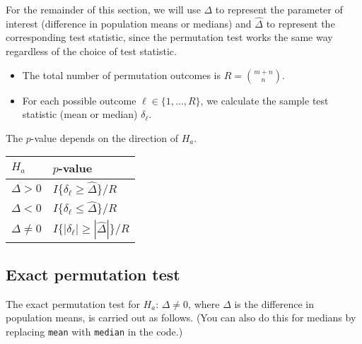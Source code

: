\documentclass[
]{book}
\providecommand{\tightlist}{%
  \setlength{\itemsep}{0pt}\setlength{\parskip}{0pt}}
\begin{document}
For the remainder of this section, we will use
\(\Delta\) to represent the parameter of interest
(difference in population means or medians)
and \(\hat{\Delta}\) to represent the corresponding test statistic,
since the permutation test works the same way regardless of the choice of test statistic.

\begin{itemize}
\tightlist
\item
  The total number of permutation outcomes is \(R = {{m + n} \choose {n}}\).
\item
  For each possible outcome \(\ell \in \{1, \dots, R\}\),
  we calculate the sample test statistic (mean or median) \(\delta_\ell\).
\end{itemize}

The \(p\)-value depends on the direction of \(H_a\).

\begin{longtable}[]{@{}ll@{}}
\toprule
\(H_a\) & \(p\)-value\tabularnewline
\midrule
\endhead
\(\Delta > 0\) & \(I\{\delta_\ell \geq \hat{\Delta}\} / R\)\tabularnewline
\(\Delta < 0\) & \(I\{\delta_\ell \leq \hat{\Delta}\} / R\)\tabularnewline
\(\Delta \neq 0\) & \(I\{|\delta_\ell| \geq |\hat{\Delta}|\} / R\)\tabularnewline
\bottomrule
\end{longtable}

\hypertarget{exact-permutation-test-1}{%
\subsection{Exact permutation test}\label{exact-permutation-test-1}}

The exact permutation test for \(H_a\): \(\Delta \neq 0\), where \(\Delta\) is the
difference in population means,
is carried out as follows.
(You can also do this for medians by replacing \texttt{mean} with \texttt{median} in the code.)
\end{document}
